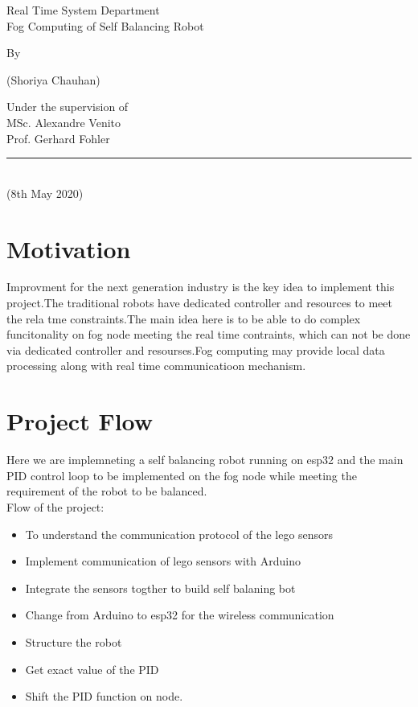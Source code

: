 \documentclass{article}
\begin{document}
	\begin{center}
		\thispagestyle{empty}
		\parskip=14pt%
		\vspace*{3\parskip}%
		
		\large Real Time System Department
				\\
		Fog Computing of Self Balancing Robot
				
		
		
		By
		
		(Shoriya Chauhan)
		
		
		
		Under the supervision of
		\\
		MSc. Alexandre Venito
		\\
		Prof. Gerhard Fohler
		\\
		\rule{7cm}{0.4pt}\\
		
				
		
		
		
		(8th May 2020)
	\end{center}
	\newpage
	


 	\section{Motivation}
 	Improvment for the next generation industry is the key idea to implement this project.The traditional robots have dedicated controller and resources to meet the rela tme constraints.The main idea here is to be able to do complex funcitonality on fog node meeting the real time contraints, which can not be done via dedicated controller and resourses.Fog computing may provide local data processing along with real time communicatioon mechanism.
 	
 	\section{Project Flow}
	Here we are implemneting a self balancing robot running on esp32 and the main PID control loop to be implemented on the fog node while meeting the requirement of the robot to be balanced. 
	\\
	Flow of the project:
	\begin{itemize}
	\item To understand the communication protocol of the lego sensors
	\item Implement communication of lego sensors with Arduino
	\item Integrate the sensors togther to build self balaning bot
	\item Change from Arduino to esp32 for the wireless communication
	\item Structure the robot
	\item Get exact value of the PID
	\item Shift the PID function on node. 
	 \end{itemize}	
	 
\end{document}
